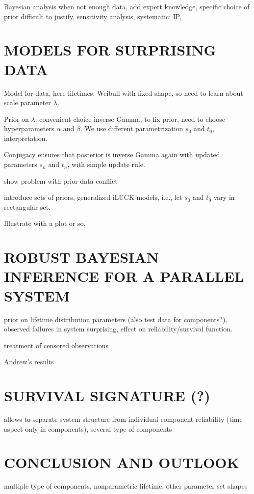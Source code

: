 \documentclass[12pt,a4paper,twocolumn,fleqn]{narms}
\begin{document}
Bayesian analysis when not enough data, add expert knowledge,
specific choice of prior difficult to justify,
sensitivity analysis, systematic: IP,


\section{MODELS FOR SURPRISING DATA}

Model for data, here lifetimes: Weibull with fixed shape,
so need to learn about scale parameter $\lambda$.

Prior on $\lambda$: convenient choice inverse Gamma,
to fix prior, need to choose hyperparameters $\alpha$ and $\beta$.
We use different parametrization $s_0$ and $t_0$, interpretation.

Conjugacy ensures that posterior is inverse Gamma again
with updated parameters $s_n$ and $t_n$,
with simple update rule.

show problem with prior-data conflict

introduce sets of priors, generalized iLUCK models, i.e.,
let $s_0$ and $t_0$ vary in rectangular set.

Illustrate with a plot or so.

\section{ROBUST BAYESIAN INFERENCE FOR A PARALLEL SYSTEM}

prior on lifetime distribution parameters (also test data for components?),
observed failures in system surprising,
effect on reliability/survival function.

treatment of censored observations


Andrew's results


\section{SURVIVAL SIGNATURE (?)}

allows to separate system structure from individual component reliability (time aspect only in components),
several type of components

\section{CONCLUSION AND OUTLOOK}


multiple type of components, nonparametric lifetime, other parameter set shapes 


%
%
\end{document}
